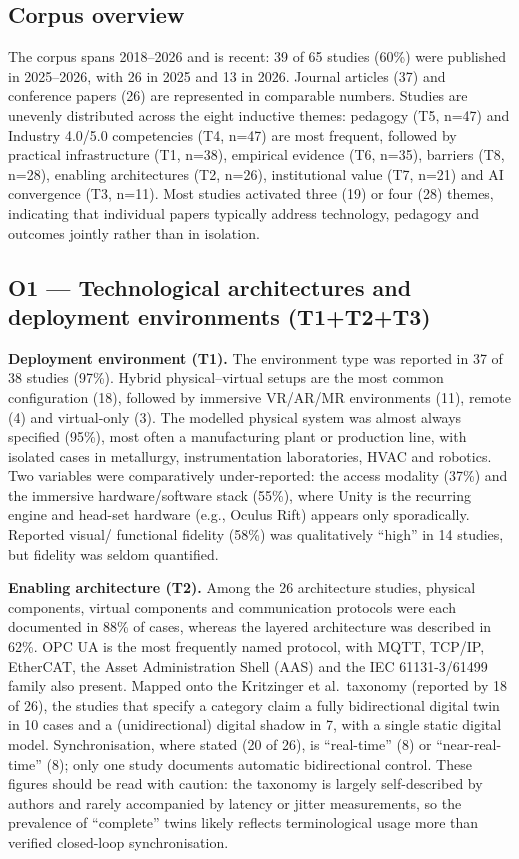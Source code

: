 \subsection{Corpus overview}\label{corpus-overview}

The corpus spans 2018--2026 and is recent: 39 of 65 studies (60\%) were published
in 2025--2026, with 26 in 2025 and 13 in 2026. Journal articles (37) and
conference papers (26) are represented in comparable numbers. Studies are
unevenly distributed across the eight inductive themes: pedagogy (T5, n=47) and
Industry 4.0/5.0 competencies (T4, n=47) are most frequent, followed by
practical infrastructure (T1, n=38), empirical evidence (T6, n=35), barriers
(T8, n=28), enabling architectures (T2, n=26), institutional value (T7, n=21)
and AI convergence (T3, n=11). Most studies activated three (19) or four (28)
themes, indicating that individual papers typically address technology,
pedagogy and outcomes jointly rather than in isolation.

\subsection{O1 --- Technological architectures and deployment environments (T1+T2+T3)}\label{o1-technological-architectures-and-deployment-environments-t1t2t3}

\textbf{Deployment environment (T1).} The environment type was reported in 37 of 38
studies (97\%). Hybrid physical--virtual setups are the most common configuration
(18), followed by immersive VR/AR/MR environments (11), remote (4) and
virtual-only (3). The modelled physical system was almost always specified
(95\%), most often a manufacturing plant or production line, with isolated cases
in metallurgy, instrumentation laboratories, HVAC and robotics. Two variables
were comparatively under-reported: the access modality (37\%) and the immersive
hardware/software stack (55\%), where Unity is the recurring engine and head-set
hardware (e.g., Oculus Rift) appears only sporadically. Reported visual/
functional fidelity (58\%) was qualitatively ``high'' in 14 studies, but fidelity
was seldom quantified.

\textbf{Enabling architecture (T2).} Among the 26 architecture studies, physical
components, virtual components and communication protocols were each documented
in 88\% of cases, whereas the layered architecture was described in 62\%. OPC UA
is the most frequently named protocol, with MQTT, TCP/IP, EtherCAT, the Asset
Administration Shell (AAS) and the IEC 61131-3/61499 family also present. Mapped
onto the Kritzinger et al.~taxonomy (reported by 18 of 26), the studies that
specify a category claim a fully bidirectional digital twin in 10 cases and a
(unidirectional) digital shadow in 7, with a single static digital model.
Synchronisation, where stated (20 of 26), is ``real-time'' (8) or ``near-real-time''
(8); only one study documents automatic bidirectional control. These figures
should be read with caution: the taxonomy is largely self-described by authors
and rarely accompanied by latency or jitter measurements, so the prevalence of
``complete'' twins likely reflects terminological usage more than verified
closed-loop synchronisation.

